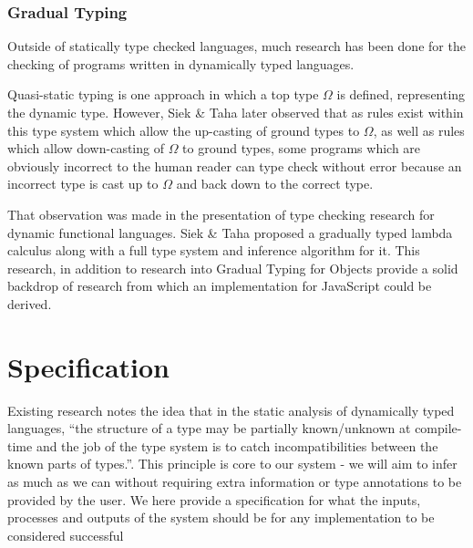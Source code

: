 \documentclass[british, twoside, openright]{bhamthesis}
\theoremstyle{definition}
\begin{document}
    \subsection{Gradual Typing}
      Outside of statically type checked languages, much research has been done for the checking of programs written in dynamically typed languages.

      Quasi-static typing\autocite{Thatte1989} is one approach in which a top type $\Omega$ is defined, representing the dynamic type. However, Siek \& Taha later observed that as rules exist within this type system which allow the up-casting of ground types to $\Omega$, as well as rules which allow down-casting of $\Omega$ to ground types, some programs which are obviously incorrect to the human reader can type check without error because an incorrect type is cast up to $\Omega$ and back down to the correct type\autocite{Siek2006}.

      That observation was made in the presentation of type checking research for dynamic functional languages. Siek \& Taha proposed a gradually typed lambda calculus along with a full type system and inference algorithm for it\autocite{Siek2006}. This research, in addition to research into Gradual Typing for Objects\autocite{Siek2007} provide a solid backdrop of research from which an implementation for JavaScript could be derived.


\chapter{Specification}

  Existing research notes the idea that in the static analysis of dynamically typed languages, ``the structure of a type may be partially known/unknown at compile-time and the job of the type system is to catch incompatibilities between the known parts of types.''\autocite{Siek2006}. This principle is core to our system - we will aim to infer as much as we can without requiring extra information or type annotations to be provided by the user. We here provide a specification for what the inputs, processes and outputs of the system should be for any implementation to be considered successful
\end{document}
